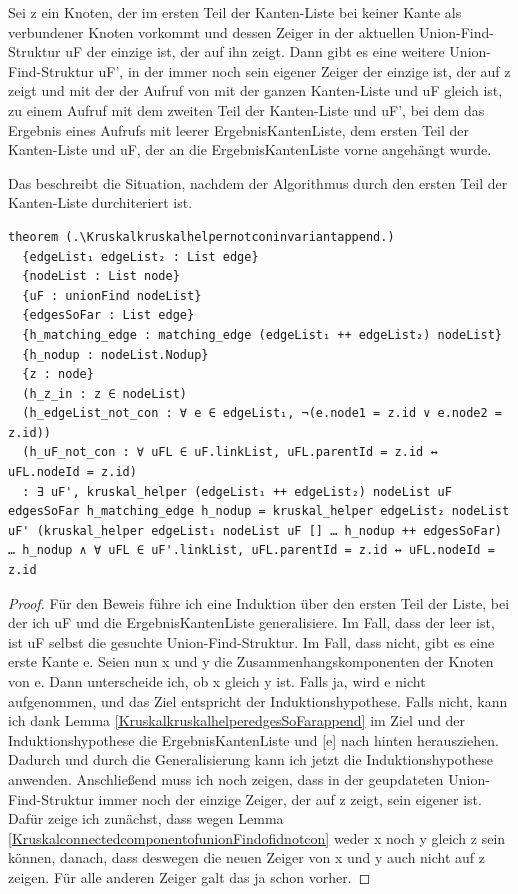 \begin{lemma}[\Kruskalkruskalhelpernotconinvariantappend]
  Sei z ein Knoten, der im ersten Teil der Kanten-Liste bei keiner Kante als verbundener Knoten vorkommt und dessen Zeiger in der aktuellen Union-Find-Struktur uF der einzige ist, der auf ihn zeigt.
  Dann gibt es eine weitere Union-Find-Struktur uF', in der immer noch sein eigener Zeiger der einzige ist, der auf z zeigt
  und mit der der Aufruf von \Kruskalkruskalhelper mit der ganzen Kanten-Liste und uF gleich ist, zu einem Aufruf mit dem zweiten Teil der Kanten-Liste und uF',
  bei dem das Ergebnis eines Aufrufs mit leerer ErgebnisKantenListe, dem ersten Teil der Kanten-Liste und uF, der an die ErgebnisKantenListe vorne angehängt wurde.

  Das beschreibt die Situation, nachdem der Algorithmus durch den ersten Teil der Kanten-Liste durchiteriert ist.
\end{lemma}
\begin{lstlisting}
theorem (.\Kruskalkruskalhelpernotconinvariantappend.)
  {edgeList₁ edgeList₂ : List edge}
  {nodeList : List node}
  {uF : unionFind nodeList}
  {edgesSoFar : List edge}
  {h_matching_edge : matching_edge (edgeList₁ ++ edgeList₂) nodeList}
  {h_nodup : nodeList.Nodup}
  {z : node}
  (h_z_in : z ∈ nodeList)
  (h_edgeList_not_con : ∀ e ∈ edgeList₁, ¬(e.node1 = z.id ∨ e.node2 = z.id))
  (h_uF_not_con : ∀ uFL ∈ uF.linkList, uFL.parentId = z.id ↔ uFL.nodeId = z.id)
  : ∃ uF', kruskal_helper (edgeList₁ ++ edgeList₂) nodeList uF edgesSoFar h_matching_edge h_nodup = kruskal_helper edgeList₂ nodeList uF' (kruskal_helper edgeList₁ nodeList uF [] … h_nodup ++ edgesSoFar) … h_nodup ∧ ∀ uFL ∈ uF'.linkList, uFL.parentId = z.id ↔ uFL.nodeId = z.id
\end{lstlisting}
\begin{proof}
  Für den Beweis führe ich eine Induktion über den ersten Teil der Liste, bei der ich uF und die ErgebnisKantenListe generalisiere.
  Im Fall, dass der leer ist, ist uF selbst die gesuchte Union-Find-Struktur.
  Im Fall, dass nicht, gibt es eine erste Kante e.
  Seien nun x und y die Zusammenhangskomponenten der Knoten von e.
  Dann unterscheide ich, ob x gleich y ist.
  Falls ja, wird e nicht aufgenommen, und das Ziel entspricht der Induktionshypothese.
  Falls nicht, kann ich dank Lemma \ref{KruskalkruskalhelperedgesSoFarappend} im Ziel und der Induktionshypothese die ErgebnisKantenListe und [e] nach hinten herausziehen.
  Dadurch und durch die Generalisierung kann ich jetzt die Induktionshypothese anwenden.
  Anschließend muss ich noch zeigen, dass in der geupdateten Union-Find-Struktur immer noch der einzige Zeiger, der auf z zeigt, sein eigener ist.
  Dafür zeige ich zunächst, dass wegen Lemma \ref{KruskalconnectedcomponentofunionFindofidnotcon} weder x noch y gleich z sein können,
  danach, dass deswegen die neuen Zeiger von x und y auch nicht auf z zeigen.
  Für alle anderen Zeiger galt das ja schon vorher.
\end{proof}



